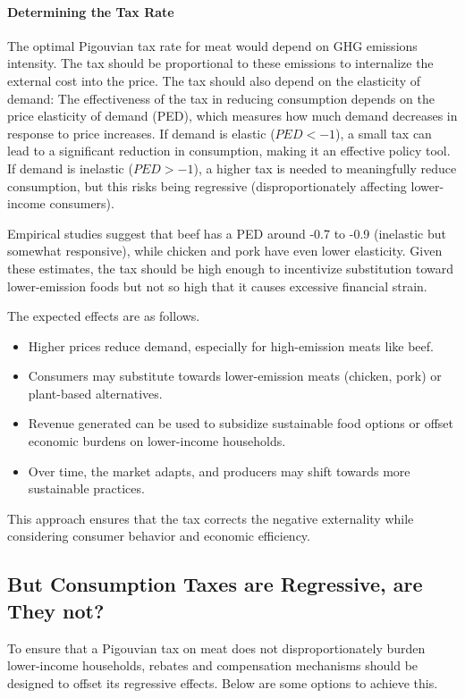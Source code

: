 \documentclass{article}[12pt,letterpaper]
\begin{document}
\paragraph{Determining the Tax Rate}
The optimal Pigouvian tax rate for meat would depend on GHG emissions intensity. The tax should be proportional to these emissions to internalize the external cost into the price.  The tax should also depend on the elasticity of demand: The effectiveness of the tax in reducing consumption depends on the price elasticity of demand (PED), which measures how much demand decreases in response to price increases. If demand is elastic ($PED < -1$), a small tax can lead to a significant reduction in consumption, making it an effective policy tool. If demand is inelastic ($PED > -1$), a higher tax is needed to meaningfully reduce consumption, but this risks being regressive (disproportionately affecting lower-income consumers).

Empirical studies suggest that beef has a PED around -0.7 to -0.9 (inelastic but somewhat responsive), while chicken and pork have even lower elasticity. Given these estimates, the tax should be high enough to incentivize substitution toward lower-emission foods but not so high that it causes excessive financial strain.  


The expected effects are as follows. 
\begin{itemize}
\item Higher prices reduce demand, especially for high-emission meats like beef.  
\item Consumers may substitute towards lower-emission meats (chicken, pork) or plant-based alternatives.  
\item Revenue generated can be used to subsidize sustainable food options or offset economic burdens on lower-income households.  
\item Over time, the market adapts, and producers may shift towards more sustainable practices.  
\end{itemize}

This approach ensures that the tax corrects the negative externality while considering consumer behavior and economic efficiency.

\subsection{But Consumption Taxes are Regressive, are They not?}
To ensure that a Pigouvian tax on meat does not disproportionately burden lower-income households, rebates and compensation mechanisms should be designed to offset its regressive effects. Below are some options to achieve this.
\end{document}
